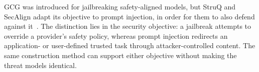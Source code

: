 GCG was introduced for jailbreaking safety-aligned models, but StruQ and
SecAlign adapt its objective to prompt injection, in order for them to 
also defend against it~\parencites{chen2025struq}{chen2025secalign}. 
The distinction lies in the security objective: a jailbreak attempts 
to override a provider's safety policy, whereas prompt injection redirects 
an application- or user-defined trusted task through attacker-controlled content. 
The same construction method can support either objective without making the 
threat models identical.
